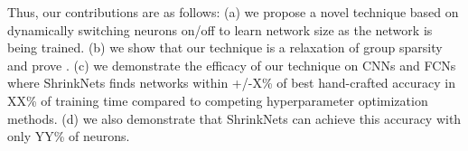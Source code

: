 Thus, our contributions are as follows: 
(a) we propose a novel technique based on dynamically switching neurons on/off 
to learn network size as the network is being trained. 
(b) we show that our technique is a relaxation of group sparsity and 
prove . 
(c) we demonstrate the efficacy of our technique on CNNs and FCNs where 
ShrinkNets finds networks within +/-X\% of best hand-crafted accuracy in XX\% of
training time compared to competing hyperparameter optimization methods.
(d) we also demonstrate that ShrinkNets can achieve this accuracy with only YY\% 
of neurons.
